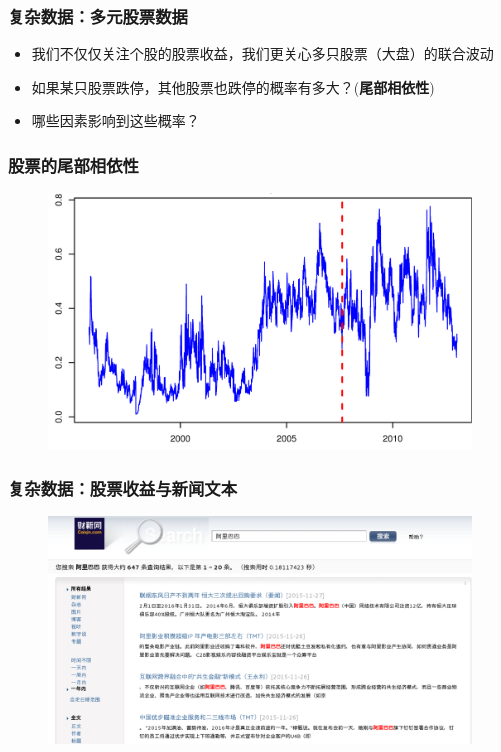 \documentclass[11pt]{beamer}
\begin{document}
\begin{frame}
  \frametitle{复杂数据：多元股票数据}

  \begin{itemize}

  \item 我们不仅仅关注个股的股票收益，我们更关心多只股票（大盘）的联合波动

  \item 如果某只股票跌停，其他股票也跌停的概率有多大？(\textbf{尾部相依性})

  \item 哪些因素影响到这些概率？
  \end{itemize}

\end{frame}

\begin{frame}
  \frametitle{股票的尾部相依性}
  \begin{figure}
    \centering
    \includegraphics[height=0.75\textheight]{tail-dep}
  \end{figure}
\end{frame}



\begin{frame}
  \frametitle{复杂数据：股票收益与新闻文本}
  \begin{figure}
    \centering
    \includegraphics[height=0.7\textheight]{plot/Caixin.png}
  \end{figure}

\end{frame}
\end{document}
